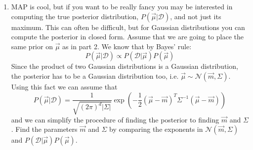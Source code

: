 \documentclass[11pt]{article}
\begin{document}
\begin{enumerate}
	\item  MAP is cool, but if you want to be really fancy you may be interested in computing the true posterior distribution, $P(\vec{\mu} | \mathcal{D})$, and not just its maximum. This can often be difficult, but for Gaussian distributions you can compute the posterior in closed form. Assume that we are going to place the same prior on $\vec{\mu}$ as in part 2. We know that by Bayes' rule: $$P(\vec{\mu} | \mathcal{D}) \propto P(\mathcal{D} | \vec{\mu})P(\vec{\mu})$$  Since the product of two Gaussian distributions is a Gaussian distribution,  the posterior has to be a Gaussian distribution too, i.e. $\vec{\mu}\sim \mathcal{N}(\vec{m}, \Sigma)$. Using this fact we can assume that 
\begin{equation}
P(\vec{\mu}| \mathcal{D}) =   \frac{1}{\sqrt{(2\pi)^{d} |\Sigma|}} \exp (-\frac{1}{2} (\vec{\mu} - \vec{m})^T \Sigma^{-1} (\vec{\mu} - \vec{m}))
\end{equation}
and we can simplify the procedure of finding the posterior to finding $\vec{m}$ and $\Sigma$. Find the parameters $\vec{m}$ and $\Sigma$ by comparing the exponents in $\mathcal{N}(\vec{m}, \Sigma)$ and $P(\mathcal{D} | \vec{\mu})P(\vec{\mu})$.
\end{enumerate}
\end{document}

